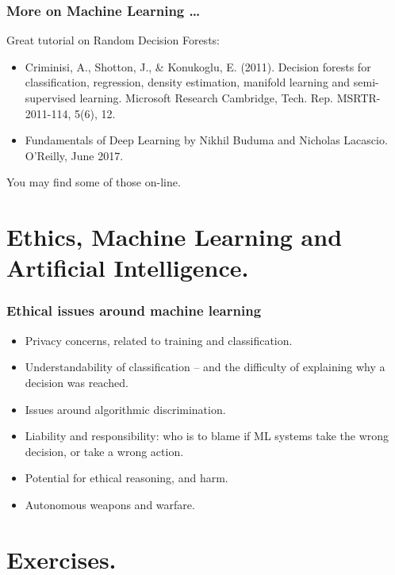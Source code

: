 \documentclass{beamer} %
\begin{document}
\begin{frame}
\frametitle{ More on Machine Learning \ldots }

Great tutorial on Random Decision Forests:
\begin{itemize}
  \item Criminisi, A., Shotton, J., \& Konukoglu, E. (2011). Decision forests for classification, regression, density estimation, manifold learning and semi-supervised learning. Microsoft Research Cambridge, Tech. Rep. MSRTR-2011-114, 5(6), 12.
  \item Fundamentals of Deep Learning by Nikhil Buduma and Nicholas Lacascio. O'Reilly, June 2017.
\end{itemize}

\vspace{3mm}
You may find some of those on-line.
\end{frame}


\section{Ethics, Machine Learning and Artificial Intelligence.}

\begin{frame}
\frametitle{ Ethical issues around machine learning }

\begin{itemize}
  \item Privacy concerns, related to training and classification.
  \item Understandability of classification -- and the difficulty of explaining why a decision was reached.
  \item Issues around algorithmic discrimination.
  \item Liability and responsibility: who is to blame if ML systems take the wrong decision, or take a wrong action.
  \item Potential for ethical reasoning, and harm.
  \item Autonomous weapons and warfare.
\end{itemize}

\end{frame}

\section{Exercises.}
\end{document}

